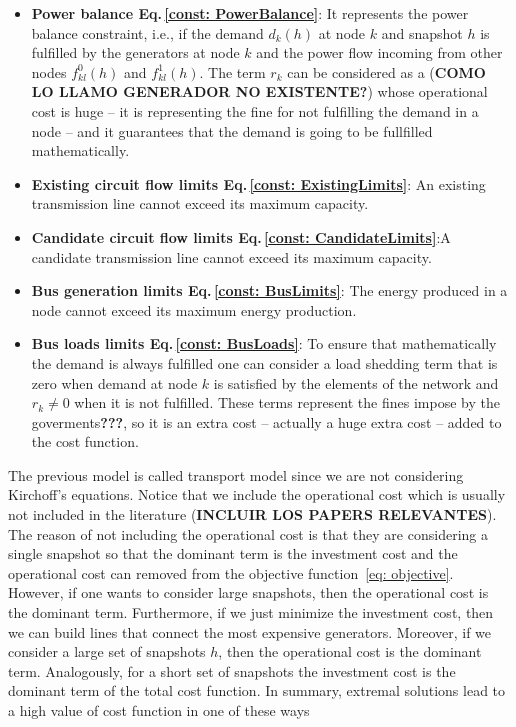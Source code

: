 \begin{itemize}
    \item \textbf{Power balance Eq.\,\eqref{const: PowerBalance}}: It represents the power balance constraint, i.e., if the demand $d_{k}(h)$ at node $k$ and snapshot $h$ is fulfilled by the generators at node $k$ and the power flow incoming from other nodes $f_{kl}^{0}(h)$ and $f_{kl}^{1}(h)$. The term $r_{k}$ can be considered as a (\textbf{COMO LO LLAMO GENERADOR NO EXISTENTE?}) whose operational cost is huge -- it is representing the fine for not fulfilling the demand in a node -- and it guarantees that the demand is going to be fullfilled mathematically. 
    \item \textbf{Existing circuit flow limits Eq.\,\eqref{const: ExistingLimits}}: An existing transmission line cannot exceed its maximum capacity.
    \item \textbf{Candidate circuit flow limits Eq.\,\eqref{const: CandidateLimits}}:A candidate transmission line cannot exceed its maximum capacity.
    \item \textbf{Bus generation limits Eq.\,\eqref{const: BusLimits}}: The energy produced in a node cannot exceed its maximum energy production.
    \item \textbf{Bus loads limits Eq.\,\eqref{const: BusLoads}}: To ensure that mathematically the demand is always fulfilled one can consider a load shedding term that is zero when demand at node $k$ is satisfied by the elements of the network and $r_{k} \neq 0$ when it is not fulfilled. These terms represent the fines impose by the goverments\textbf{???}, so it is an extra cost -- actually a huge extra cost -- added to the cost function.
\end{itemize}
The previous model is called transport model since we are not considering Kirchoff's equations. Notice that we include the operational cost which is usually not included in the literature (\textbf{INCLUIR LOS PAPERS RELEVANTES}). The reason of not including the operational cost is that they are considering a single snapshot so that the dominant term is the investment cost and the operational cost can removed from the objective function \,\eqref{eq: objective}. However, if one wants to consider large snapshots, then the operational cost is the dominant term. Furthermore, if we just minimize the investment cost, then we can build lines that connect the most expensive generators. Moreover, if we consider a large set of snapshots $h$, then the operational cost is the dominant term. Analogously, for a short set of snapshots the investment cost is the dominant term of the total cost function. In summary, extremal solutions lead to a high value of cost function in one of these ways
